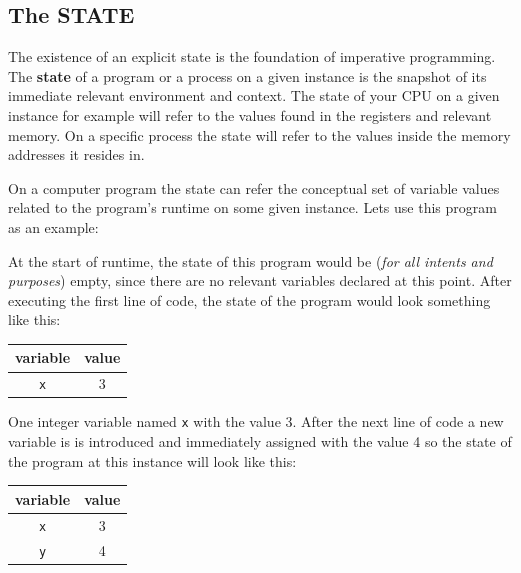 \subsection{The STATE}\label{imperative-programming.md__the-state}

The existence of an explicit state is the foundation of imperative
programming. The \textbf{state} of a program or a process on a given
instance is the snapshot of its immediate relevant environment and
context. The state of your CPU on a given instance for example will
refer to the values found in the registers and relevant memory. On a
specific process the state will refer to the values inside the memory
addresses it resides in.

On a computer program the state can refer the conceptual set of variable
values related to the program's runtime on some given instance. Lets use
this program as an example:

\begin{Shaded}
\begin{Highlighting}[]
\OperatorTok{=} 
\OperatorTok{=} 
\OperatorTok{=}\OperatorTok{+}
\end{Highlighting}
\end{Shaded}

At the start of runtime, the state of this program would be (\emph{for
all intents and purposes}) empty, since there are no relevant variables
declared at this point. After executing the first line of code, the
state of the program would look something like this:

\begin{longtable}[]{@{}cc@{}}
\toprule\noalign{}
variable & value \\
\midrule\noalign{}
\endhead
\bottomrule\noalign{}
\endlastfoot
\texttt{x} & 3 \\
\end{longtable}

One integer variable named \texttt{x} with the value 3. After the next
line of code a new variable is is introduced and immediately assigned
with the value 4 so the state of the program at this instance will look
like this:

\begin{longtable}[]{@{}cc@{}}
\toprule\noalign{}
variable & value \\
\midrule\noalign{}
\endhead
\bottomrule\noalign{}
\endlastfoot
\texttt{x} & 3 \\
\texttt{y} & 4 \\
\end{longtable}

